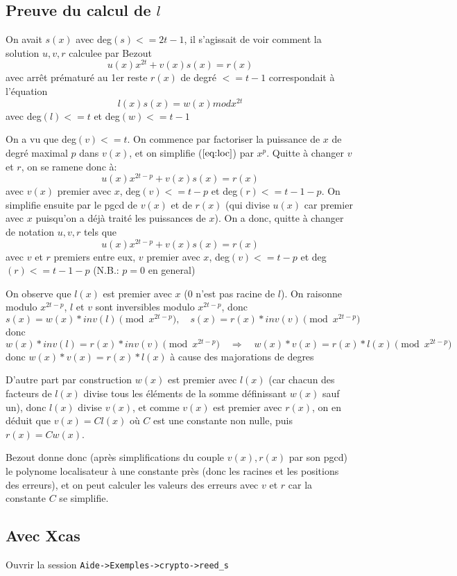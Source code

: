 \documentclass[a4paper,11pt]{book}
\begin{document}
\begin{giacjshere}
\subsection{Preuve du calcul de $l$}
On avait $s(x)$ avec deg$(s)<=2t-1$,
il s'agissait de voir comment la solution $u,v,r$ calculee par Bezout
\begin{equation}   \label{eq:loc}
 u(x)  x^{2t}+ v(x) s(x) = r(x) 
\end{equation}
avec arr\^et pr\'ematur\'e au 1er reste $r(x)$ de degr\'e $<=t-1$ 
correspondait \`a l'\'equation
\[   l(x) s(x) = w(x) mod x^{2t} \]
avec deg$(l)<=t$ et deg$(w)<=t-1$

On a vu que deg$(v)<=t$.
On commence par factoriser la puissance de $x$ de degr\'e maximal $p$ dans
$v(x)$, et on simplifie (\(\ref{eq:loc}\)) par $x^p$. 
Quitte \`a changer $v$ et $r$, on se
ramene donc \`a:
\[   u(x)  x^{2t-p}+ v(x) s(x) = r(x) \]
avec $v(x)$ premier avec $x$, deg$(v)<= t-p$ et deg$(r)<= t-1-p$.
On simplifie ensuite par le pgcd de $v(x)$ et de $r(x)$
(qui divise $u(x)$ car premier avec $x$ puisqu'on a d\'ej\`a trait\'e les
puissances de $x$).
On a donc, quitte \`a changer de notation $u,v,r$ tels que
\[  u(x)  x^{2t-p}+ v(x) s(x) = r(x) \]
avec $v$ et $r$ premiers entre eux, $v$ premier avec $x$,
deg$(v)<=t-p$ et deg$(r)<=t-1-p$ (N.B.: $p=0$ en general)

On observe que $l(x)$ est premier avec $x$ ($0$ n'est pas racine de $l$).
On raisonne modulo $x^{2t-p}$, $l$ et $v$ sont inversibles modulo $x^{2t-p}$,
donc 
\[ s(x) = w(x)*inv(l) \pmod{ x^{2t-p}},
\quad s(x) = r(x)*inv(v) \pmod {x^{2t-p}} \]
donc 
\[ w(x)*inv(l)=r(x)*inv(v) \pmod{x^{2t-p}} 
\quad \Rightarrow \quad w(x)*v(x)=r(x)*l(x) \pmod {x^{2t-p}} \]
donc $w(x)*v(x)=r(x)*l(x)$ \`a cause des majorations de degres

D'autre part par construction $w(x)$ est premier avec $l(x)$ (car chacun
des facteurs de $l(x)$ divise tous les \'el\'ements de la somme d\'efinissant
$w(x)$ sauf un), donc $l(x)$ divise $v(x)$, et comme $v(x)$ est premier
avec $r(x)$, on en d\'eduit que $v(x)=C l(x)$ o\`u $C$ est une constante non
nulle, puis $r(x) = C w(x)$.

Bezout donne donc (apr\`es simplifications du couple $v(x), r(x)$ par
son pgcd) le polynome localisateur \`a une constante pr\`es (donc les
racines et les positions des erreurs), et on peut calculer
les valeurs des erreurs avec $v$ et $r$ car la constante $C$ se simplifie.

\subsection{Avec Xcas}
Ouvrir la session \verb|Aide->Exemples->crypto->reed_s|



\end{giacjshere}
\end{document}
